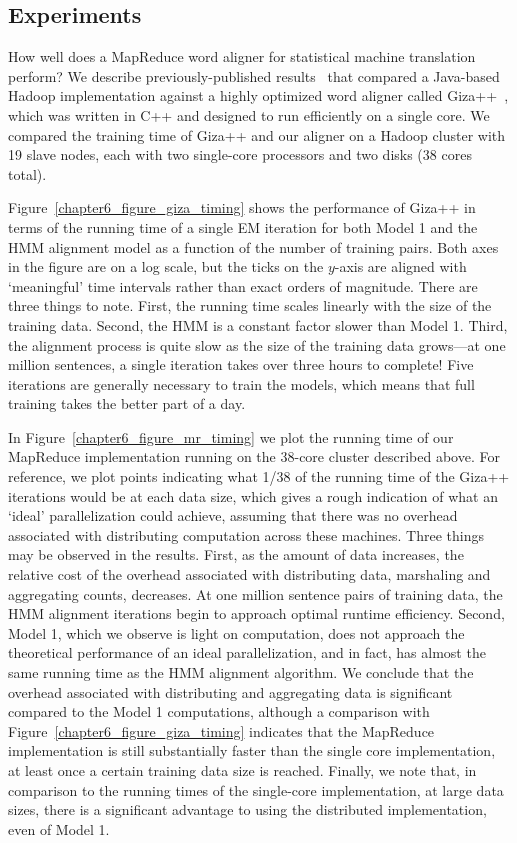 \subsection{Experiments}

How well does a MapReduce word aligner for statistical machine
translation perform?  We describe previously-published
results~\cite{Dyer_etal_2008} that compared a Java-based Hadoop
implementation against a highly optimized word aligner called
Giza++~\cite{Och_2003}, which was written in C++ and designed to run
efficiently on a single core.  We compared the training time of Giza++
and our aligner on a Hadoop cluster with 19 slave nodes, each with two
single-core processors and two disks (38 cores total).

Figure~\ref{chapter6_figure_giza_timing} shows the performance of
Giza++ in terms of the running time of a single EM iteration for both
Model 1 and the HMM alignment model as a function of the number of
training pairs.  Both axes in the figure are on a log scale, but the
ticks on the $y$-axis are aligned with `meaningful' time intervals
rather than exact orders of magnitude.  There are three things to
note.  First, the running time scales linearly with the size of the
training data.  Second, the HMM is a constant factor slower than Model
1.  Third, the alignment process is quite slow as the size of the
training data grows---at one million sentences, a single iteration
takes over three hours to complete!  Five iterations are generally
necessary to train the models, which means that full training takes
the better part of a day.

In Figure~\ref{chapter6_figure_mr_timing} we plot the running time of
our MapReduce implementation running on the 38-core cluster described
above.  For reference, we plot points indicating what 1/38 of the
running time of the Giza++ iterations would be at each data size,
which gives a rough indication of what an `ideal' parallelization
could achieve, assuming that there was no overhead associated with
distributing computation across these machines.  Three things may be
observed in the results.  First, as the amount of data increases, the
relative cost of the overhead associated with distributing data,
marshaling and aggregating counts, decreases.  At one million sentence
pairs of training data, the HMM alignment iterations begin to approach
optimal runtime efficiency.  Second, Model 1, which we observe is
light on computation, does not approach the theoretical performance of
an ideal parallelization, and in fact, has almost the same running
time as the HMM alignment algorithm. We conclude that the overhead
associated with distributing and aggregating data is significant
compared to the Model 1 computations, although a comparison with
Figure~\ref{chapter6_figure_giza_timing} indicates that the MapReduce
implementation is still substantially faster than the single core
implementation, at least once a certain training data size is reached.
Finally, we note that, in comparison to the running times of the
single-core implementation, at large data sizes, there is a
significant advantage to using the distributed implementation, even of
Model 1.

